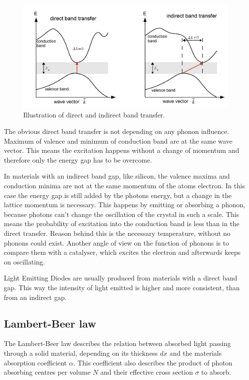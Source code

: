\documentclass[]{article}
\begin{document}
\begin{figure}[H]
\centering
\includegraphics[width=.8\textwidth]{Plots/transfer.png}
\caption{Illustration of direct and indirect band transfer. \cite{wiki}}
\label{fig:band transfer}
\end{figure}

The obvious direct band transfer is not depending on any phonon influence. Maximum of valence and minimum of conduction band are at the same wave vector. This means the excitation happens without a change of momentum and therefore only the energy gap has to be overcome. 

In materials with an indirect band gap, like silicon, the valence maxima and conduction minima are not at the same momentum of the atoms electron. In this case the energy gap is still added by the photons energy, but a change in the lattice momentum is necessary. This happens by emitting or absorbing a phonon, because photons can't change the oscillation of the crystal in such a scale. This means the probability of excitation into the conduction band is less than in the direct transfer. Reason behind this is the necessary temperature, without no phonons could exist. Another angle of view on the function of phonons is to compare them with a catalyser, which excites the electron and afterwards keeps on oscillating. 


Light Emitting Diodes are usually produced from materials with a direct band gap. This way the intensity of light emitted is higher and more consistent, than from an indirect gap.

\subsection{Lambert-Beer law}
The Lambert-Beer law describes the relation between absorbed light passing through a solid material, depending on its thickness $dx$ and the materials absorption coefficient $\alpha$. This coefficient also describes the   product of photon absorbing centres per volume $N$ and their effective cross section $\sigma$ to absorb. 
\end{document}
